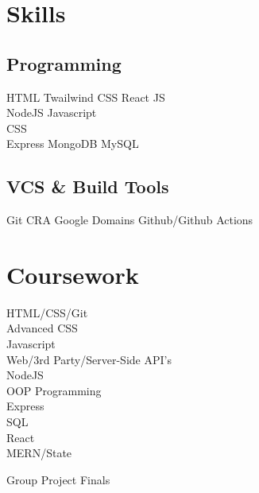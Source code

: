 \documentclass[]{deedy-resume-openfont}
\begin{document}
\begin{minipage}[t]{0.33\textwidth} 


\section{Skills}
\subsection{Programming}
HTML \textbullet{} Twailwind CSS \textbullet{} React JS \ \\ 
NodeJS \textbullet{} Javascript \\
\textbullet{} CSS \\
Express \textbullet{}
MongoDB \textbullet{ }MySQL 
\subsection{VCS \& Build Tools}
Git \textbullet{} CRA \textbullet{}Google Domains \textbullet{} Github/Github Actions
\sectionsep



\section{Coursework}
HTML/CSS/Git \\
Advanced CSS \\
Javascript \\
Web/3rd Party/Server-Side API's \\
NodeJS \\
OOP Programming \\
Express \\
SQL \\
React \\
MERN/State \\
\item Group Project Finals
 

\end{minipage}%
\end{document}
